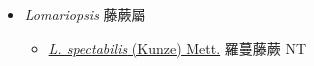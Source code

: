 
  \begin{itemize}
 \item[] \textit{Lomariopsis} 藤蕨屬
                    
  \begin{itemize}
        \item[] \href{http://www.theplantlist.org/tpl1.1/search?q=Lomariopsis+spectabilis}{\textit{L. spectabilis} (Kunze) Mett.}   羅蔓藤蕨 NT
  \end{itemize}
  \end{itemize}
